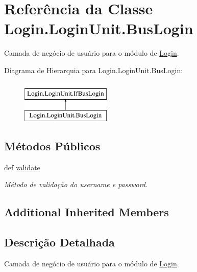 \hypertarget{classLogin_1_1LoginUnit_1_1BusLogin}{\section{Referência da Classe Login.\-Login\-Unit.\-Bus\-Login}
\label{classLogin_1_1LoginUnit_1_1BusLogin}
}


Camada de negócio de usuário para o módulo de \hyperlink{namespaceLogin}{Login}.  


Diagrama de Hierarquia para Login.\-Login\-Unit.\-Bus\-Login\-:\begin{figure}[H]
\begin{center}
\leavevmode
\includegraphics[height=2.000000cm]{d9/d51/classLogin_1_1LoginUnit_1_1BusLogin}
\end{center}
\end{figure}
\subsection*{Métodos Públicos}
\begin{DoxyCompactItemize}
\item 
def \hyperlink{classLogin_1_1LoginUnit_1_1BusLogin_a2301425767b811697ce559801b955a58}{validate}
\begin{DoxyCompactList}\small\item\em Método de validação do username e password. \end{DoxyCompactList}\end{DoxyCompactItemize}
\subsection*{Additional Inherited Members}


\subsection{Descrição Detalhada}
Camada de negócio de usuário para o módulo de \hyperlink{namespaceLogin}{Login}. 



